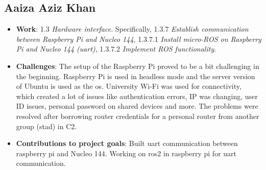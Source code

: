\subsection*{Aaiza Aziz Khan}
\begin{itemize}
    \item \textbf{Work}:  1.3 \textit{Hardware interface}. Specifically, 1.3.7 \textit{Establish communication between Raspberry Pi and Nucleo 144}, 1.3.7.1 \textit{Install micro-ROS on Raspberry Pi and Nucleo 144 (\ac{uart})}, 1.3.7.2 \textit{Implement ROS functionality}.
    \item \textbf{Challenges}: The setup of the Raspberry Pi proved to be a bit challenging in the beginning. Raspberry Pi is used in headless mode and the server version of Ubuntu is used as the \ac{os}. University Wi-Fi was used for connectivity, which created a lot of issues like authentication errors, IP was changing, user ID issues, personal password on shared devices and more. The problems were resolved after borrowing router credentials for a personal router from another group (\ac{stad}) in C2.
    \item \textbf{Contributions to project goals}: Built \ac{uart} communication between raspberry pi and Nucleo 144. Working on \ac{ros2} in raspberry pi for \ac{uart} communication.
\end{itemize}
